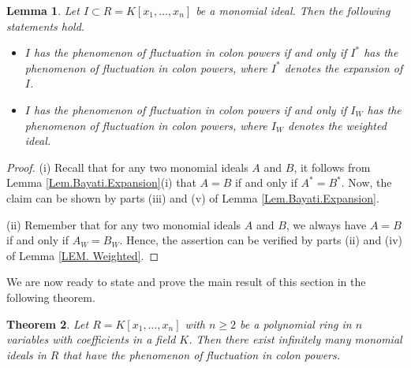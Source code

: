 \documentclass[11pt]{amsart}
\newtheorem{theorem}{Theorem}[section]
\newtheorem{lemma}[theorem]{Lemma}
\begin{document}
\begin{lemma}\label{Lem.Fluctuation} 
Let  $I \subset R=K[x_1, \ldots, x_n]$ be a monomial ideal.  Then the following statements hold.
\begin{itemize}
\item[(i)] $I$ has the  phenomenon  of  fluctuation in colon powers   if and only if $I^*$ has the  phenomenon  of  fluctuation in colon powers,
  where $I^*$ denotes the  expansion of $I$.  
\item[(ii)] $I$ has the  phenomenon  of  fluctuation in colon powers  if and only if $I_W$ has the  phenomenon  of  fluctuation in colon powers, 
  where $I_W$ denotes the  weighted ideal.    
\end{itemize}
\end{lemma}

\begin{proof}
(i) Recall that  for any two monomial ideals $A$ and $B$, it follows from Lemma \ref{Lem.Bayati.Expansion}(i)  that $A=B$ if and only if $A^*=B^*$. 
Now, the claim can be shown by parts (iii) and (v) of  Lemma \ref{Lem.Bayati.Expansion}.
 

(ii)   Remember that   for any two monomial ideals $A$ and  $B$, we always have $A=B$ if and only if $A_W=B_W$. Hence,  the assertion can be verified 
 by parts (ii) and (iv) of  Lemma \ref{LEM. Weighted}.
\end{proof}


We are now ready to state and prove the main result of this section in the following theorem. 

\begin{theorem} \label{Th.Fluctuation}
Let $R=K[x_1, \ldots, x_n]$ with $n\geq 2$ be  a polynomial ring in $n$  variables  with coefficients in a  field $K$. 
Then there exist infinitely many  monomial ideals  in $R$  that  have  the  phenomenon  of  fluctuation in colon powers. 
\end{theorem}
\end{document}
